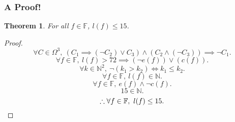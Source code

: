 \documentclass{report}
\newtheorem{thm}{Theorem}
\begin{document}
\subsubsection{A Proof!}
\begin{thm}
        For all $f \in \mathbb F$, $l(f) \leq 15$.
\end{thm}
\begin{proof}
        \[
                \forall C \in \Omega^3,\ 
                \left(C_1 \implies (\neg C_2) \lor C_3\right)
                \land
                \left(C_2 \land (\neg C_3)\right)
                \implies \neg C_1.
        \]
        \[
                \forall f \in \mathbb F,\ 
                l(f) > 72 \implies \left(\neg e(f)\right) \lor \left(c(f)\right).
        \]
        \[
                \forall k \in \mathbb N^2,\ 
                \neg \left(k_1 > k_2\right) \iff k_1 \leq k_2.
        \]
        \[
                \forall f \in \mathbb F,\ 
                l(f) \in \mathbb N.
        \]
        \[
                \forall f \in \mathbb F,\ 
                e(f) \land \neg c(f).
        \]
        \[
                15 \in \mathbb N.
        \]
        \[
                \therefore
                \forall f \in \mathbb F,\ 
                l(f) \leq 15.
                \qedhere
        \]
\end{proof}
\end{document}
